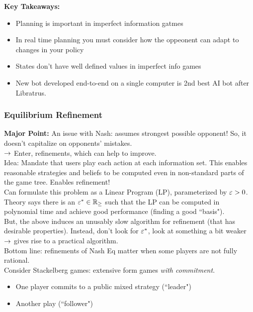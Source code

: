 {\bf Key Takeaways:}
\begin{itemize}
    \item Planning is important in imperfect information gatmes
    \item In real time planning you must consider how the oppeonent can adapt to changes in your policy
    \item States don't have well defined values in imperfect info games
    \item New bot developed end-to-end on a single computer is 2nd best AI bot after Libratrus.
\end{itemize}

\subsubsection{Equilibrium Refinement}

{\bf Major Point:} An issue with Nash: assumes strongest possible opponent! So, it doesn't capitalize on opponents' mistakes. \\

$\rightarrow$ Enter, refinements, which can help to improve. \\

Idea: Mandate that users play each action at each information set. This enables reasonable strategies and beliefs to be computed even in non-standard parts of the game tree. Enables refinement!\\

Can formulate this problem as a Linear Program (LP), parameterized by $\varepsilon > 0$. Theory says there is an $\varepsilon^* \in \mathbb{R}_{\geq}$ such that the LP can be computed in polynomial time and achieve good performance (finding a good ``basis"). \\

But, the above induces an unusably slow algorithm for refinement (that has desirable properties). Instead, don't look for $\varepsilon^*$, look at something a bit weaker $\rightarrow$ gives rise to a practical algorithm. \\

Bottom line: refinements of Nash Eq matter when some players are not fully rational. \\

Consider Stackelberg games: extensive form games {\it with commitment}.
\begin{itemize}
    \item One player commits to a public mixed strategy (``leader")
    \item Another play (``follower")
\end{itemize}

